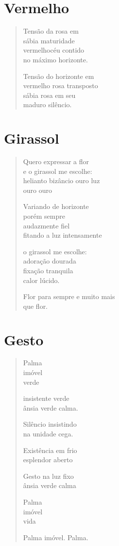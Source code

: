 \chapter{Vermelho}

\begin{verse}
Tensão da rosa em\\
sábia maturidade\\
vermelhocéu contido\\
no máximo horizonte.

Tensão do horizonte em\\
vermelho rosa transposto\\
sábia rosa em seu\\
maduro silêncio.
\end{verse}

\chapter{Girassol}

\begin{verse}
Quero expressar a flor\\
e o girassol me escolhe:\\
helianto bizâncio ouro luz\\
\hfill{}ouro ouro

Variando de horizonte\\
porém sempre\\
audazmente fiel\\
fitando a luz intensamente

o girassol me escolhe:\\
adoração dourada\\
fixação tranquila\\
calor lúcido.

Flor para sempre e muito mais\\
que flor.
\end{verse}

\chapter{Gesto}

\begin{verse}
Palma\\
imóvel\\
verde

insistente verde\\
ânsia verde calma.

Silêncio insistindo\\
na unidade cega.

Existência em frio\\
esplendor aberto

Gesto na luz fixo\\
ânsia verde calma

Palma\\
imóvel\\
vida

Palma imóvel. Palma.
\end{verse}

